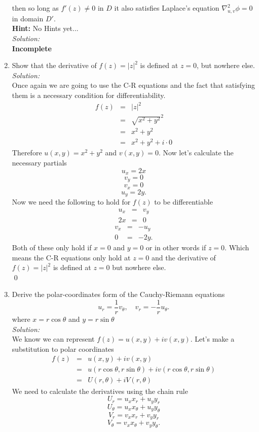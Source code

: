 \documentclass[10pt]{amsart}
\theoremstyle{nonumberplain}
\begin{document}
\begin{enumerate}[label={\bf {\arabic*}:}]
then so long as $f'(z) \neq 0$ in $D$ it also satisfies Laplace's equation $\nabla_{u, v}^2 \phi = 0$ in domain $D'$. \\
\textbf{Hint:} No Hints yet... \\
\textit{Solution:} \\
\textbf{Incomplete} \\
\item Show that the derivative of $f(z)=|z|^2$ is defined at $z=0$, but nowhere else.\\
\textit{Solution:} \\
Once again we are going to use the C-R equations and the fact that satisfying them is a necessary condition for differentiability.
\begin{eqnarray*}
f(z) &=&|z|^2 \\
      &=&\sqrt{x^2 + y^2}^2 \\
      &=& x^2 + y^2 \\
      &=& x^2 + y^2 + i \cdot 0
\end{eqnarray*}
Therefore $u(x, y) = x^2 + y^2$ and $v(x, y) = 0$. Now let's calculate the necessary partials
$$u_x = 2x$$ $$v_y = 0$$ $$v_x = 0$$ $$u_y = 2y.$$
Now we need the following to hold for $f(z)$ to be differentiable
\begin{eqnarray*}
u_x &=& v_y \\
2x &=& 0
\end{eqnarray*}
\begin{eqnarray*}
v_x &=& - u_y \\
0 &=& - 2y.
\end{eqnarray*}
Both of these only hold if $x=0$ and $y=0$ or in other words if $z=0$.
Which means the C-R equations only hold at $z=0$ and the derivative of $f(z) = |z|^2$ is defined at $z=0$ but nowhere else. \\
\qed

\item Derive the polar-coordinates form of the Cauchy-Riemann equations
$$
u_r=\frac{1}{r} v_\theta, \quad v_r=-\frac{1}{r} u_\theta.
$$
where $x=r \cos \theta$ and $y=r \sin \theta$ \\
\textit{Solution:} \\
We know we can represent $f(z) = u(x, y) + i v(x, y)$.
Let's make a substitution to polar coordinates
\begin{eqnarray*}
f(z) &=& u(x, y) + i v(x, y) \\
      &=& u(r \cos \theta, r \sin \theta) + i v(r \cos \theta, r \sin \theta) \\
      &=& U(r, \theta) + iV(r, \theta)
\end{eqnarray*}
We need to calculate the derivatives using the chain rule
$$U_r = u_xx_r + u_yy_r$$
$$U_\theta = u_xx_\theta + u_yy_\theta$$
$$V_r = v_xx_r + v_yy_r$$
$$V_\theta = v_xx_\theta + v_yy_\theta.$$


\end{enumerate}
\end{document}
